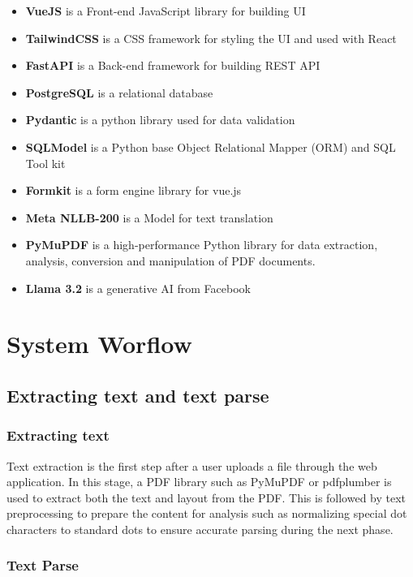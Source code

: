 \documentclass[12pt,oneside,openright,a4paper]{cpe-english-project}
\begin{document}
\begin{itemize}
\item  \textbf{VueJS} is a Front-end JavaScript library for building UI
\item \textbf{TailwindCSS} is a CSS framework for styling the UI and used with React
\item \textbf{FastAPI} is a Back-end framework for building REST API
\item \textbf{PostgreSQL}  is a relational database
\item \textbf{Pydantic}  is a python library used for data validation 
\item \textbf{SQLModel} is a Python base Object Relational Mapper (ORM) and SQL Tool kit
\item \textbf{Formkit} is a form engine library for vue.js
\item \textbf{Meta NLLB-200} is a Model for text translation
\item \textbf{PyMuPDF}  is a high-performance Python library for data extraction, analysis, conversion and manipulation of PDF documents.
\item \textbf{Llama 3.2} is a generative AI from Facebook
\end{itemize}


\section{System Worflow}

\subsection{Extracting text and text parse}

\subsubsection{Extracting text}

Text extraction is the first step after a user uploads a file through the web application. In this stage, a PDF library such as PyMuPDF or pdfplumber is used to extract both the text and layout from the PDF. This is followed by text preprocessing to prepare the content for analysis such as normalizing special dot characters to standard dots to ensure accurate parsing during the next phase.

\subsubsection{Text Parse}
\end{document}
